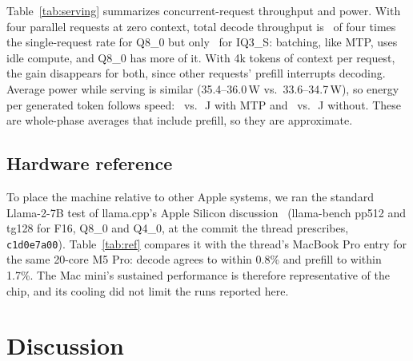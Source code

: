 \documentclass[11pt]{article}
\begin{document}
Table~\ref{tab:serving} summarizes concurrent-request throughput and power. With four
parallel requests at zero context, total decode throughput is \concEffQE\ of four times the
single-request rate for Q8\_0 but only \concEffIQ\ for IQ3\_S: batching, like MTP,
uses idle compute, and Q8\_0 has more of it. With 4k tokens of context per request, the gain
disappears for both, since other requests' prefill interrupts decoding. Average power while
serving is similar (35.4--36.0\,W vs.\ 33.6--34.7\,W), so energy per generated token follows speed:
\IQjtok\ vs.\ \QEjtok\,J with MTP and \IQjtokPlain\ vs.\ \QEjtokPlain\,J without. These are
whole-phase averages that include prefill, so they are approximate.

\begin{table}[t]
  \centering
  \caption{Concurrency (llama-benchy, 512-token prompts, MTP off) and power
  (\texttt{powermetrics}, CPU+GPU+ANE). $^\ddagger$Server-phase average power divided by
  short-chat decode speed.}
  \label{tab:serving}
  \small
  
\end{table}

\subsection{Hardware reference}
\label{sec:ref}

To place the machine relative to other Apple systems, we ran the standard Llama-2-7B test of
llama.cpp's Apple Silicon discussion~\cite{llamacpp4167} (llama-bench pp512 and tg128 for
F16, Q8\_0 and Q4\_0, at the commit the thread prescribes, \texttt{c1d0e7a00}). Table~\ref{tab:ref}
compares it with the thread's MacBook Pro entry for the same 20-core M5 Pro: decode agrees
to within 0.8\% and prefill to within 1.7\%. The Mac mini's sustained performance is
therefore representative of the chip, and its cooling did not limit the runs reported here.

\begin{table}[t]
  \centering
  \caption{llama.cpp Apple Silicon reference (Llama-2 7B, tokens/s, commit
  \texttt{c1d0e7a00}).}
  \label{tab:ref}
  \small
  
\end{table}

\section{Discussion}
\end{document}
